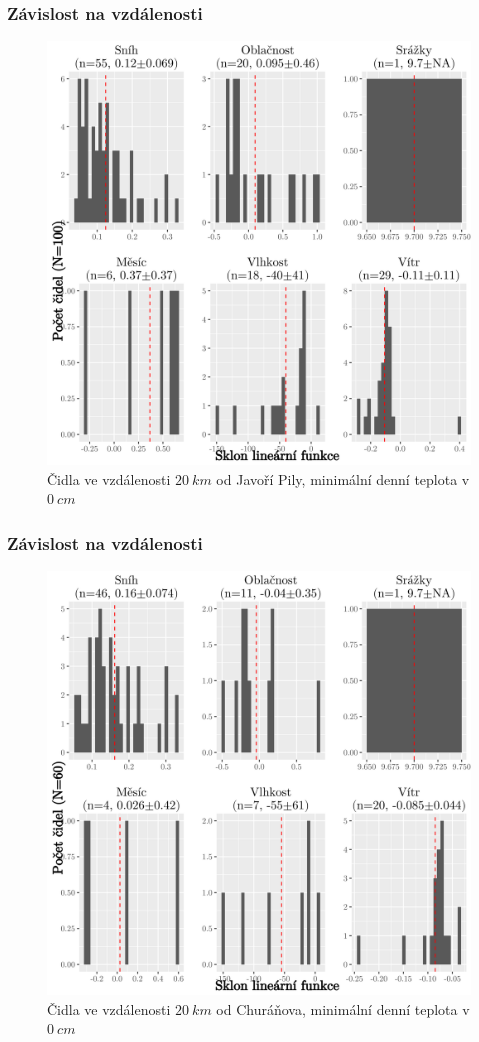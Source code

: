 \documentclass[
	11pt, %
]{beamer}
\begin{document}
\begin{frame}
	\frametitle{Závislost na vzdálenosti}
	\begin{figure}
		\includegraphics[width=0.8\linewidth,height=0.6\textwidth]{all100minTall0cm_BWyesc4japi0120000.png}
		\caption{Čidla ve vzdálenosti $\SI{20}{km}$ od Javoří Pily, minimální denní teplota v $\SI{0}{cm}$}
	\end{figure}
\end{frame}

\begin{frame}
	\frametitle{Závislost na vzdálenosti}
	\begin{figure}
		\includegraphics[width=0.8\linewidth,height=0.6\textwidth]{all60minTall0cm_BWyesc1chur0120000.png}
		\caption{Čidla ve vzdálenosti $\SI{20}{km}$ od Churáňova, minimální denní teplota v $\SI{0}{cm}$}
	\end{figure}
\end{frame}
\end{document}
